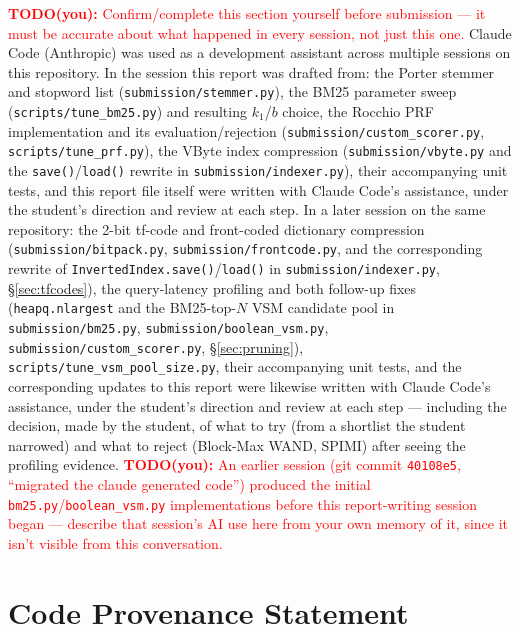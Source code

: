 \documentclass[11pt]{article}
\newcommand{\todo}[1]{\textcolor{red}{\textbf{TODO(you):} #1}}
\begin{document}
\todo{Confirm/complete this section yourself before submission --- it
must be accurate about what happened in every session, not just this
one.} Claude Code (Anthropic) was used as a development assistant across
multiple sessions on this repository. In the session this report was
drafted from: the Porter stemmer and stopword list
(\texttt{submission/stemmer.py}), the BM25 parameter sweep
(\texttt{scripts/tune\_bm25.py}) and resulting $k_1$/$b$ choice, the
Rocchio PRF implementation and its evaluation/rejection
(\texttt{submission/custom\_scorer.py}, \texttt{scripts/tune\_prf.py}),
the VByte index compression (\texttt{submission/vbyte.py} and the
\texttt{save()}/\texttt{load()} rewrite in \texttt{submission/indexer.py}),
their accompanying unit tests, and this report file itself were written
with Claude Code's assistance, under the student's direction and review
at each step. In a later session on the same repository: the 2-bit
tf-code and front-coded dictionary compression
(\texttt{submission/bitpack.py}, \texttt{submission/frontcode.py}, and
the corresponding rewrite of \texttt{InvertedIndex.save()}/\texttt{load()}
in \texttt{submission/indexer.py}, \S\ref{sec:tfcodes}), the query-latency
profiling and both follow-up fixes (\texttt{heapq.nlargest} and the
BM25-top-$N$ VSM candidate pool in \texttt{submission/bm25.py},
\texttt{submission/boolean\_vsm.py}, \texttt{submission/custom\_scorer.py},
\S\ref{sec:pruning}), \texttt{scripts/tune\_vsm\_pool\_size.py}, their
accompanying unit tests, and the corresponding updates to this report
were likewise written with Claude Code's assistance, under the student's
direction and review at each step --- including the decision, made by
the student, of what to try (from a shortlist the student narrowed) and
what to reject (Block-Max WAND, SPIMI) after seeing the profiling
evidence. \todo{An earlier session (git commit \texttt{40108e5},
``migrated the claude generated code'') produced the initial
\texttt{bm25.py}/\texttt{boolean\_vsm.py} implementations before this
report-writing session began --- describe that session's AI use here
from your own memory of it, since it isn't visible from this
conversation.}

\section{Code Provenance Statement}
\end{document}
